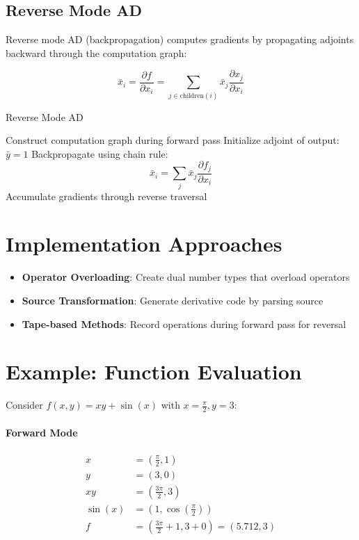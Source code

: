 \documentclass{article}
\begin{document}
\subsection{Reverse Mode AD}
Reverse mode AD (backpropagation) computes gradients by propagating adjoints backward through the computation graph:

\begin{equation}
\bar{x}_i = \frac{\partial f}{\partial x_i} = \sum_{j \in \text{children}(i)} \bar{x}_j \frac{\partial x_j}{\partial x_i}
\end{equation}

\begin{algorithm}
\caption{Reverse Mode AD}
\begin{algorithmic}[1]
\State Construct computation graph during forward pass
\State Initialize adjoint of output: $\bar{y} = 1$
\State Backpropagate using chain rule:
\[
\bar{x}_i = \sum_{j} \bar{x}_j \frac{\partial f_j}{\partial x_i}
\]
\State Accumulate gradients through reverse traversal
\end{algorithmic}
\end{algorithm}

\section{Implementation Approaches}
\begin{itemize}
\item \textbf{Operator Overloading}: Create dual number types that overload operators
\item \textbf{Source Transformation}: Generate derivative code by parsing source
\item \textbf{Tape-based Methods}: Record operations during forward pass for reversal
\end{itemize}

\section{Example: Function Evaluation}
Consider $f(x, y) = xy + \sin(x)$ with $x = \frac{\pi}{2}, y = 3$:

\paragraph{Forward Mode}
\begin{align*}
x &= (\frac{\pi}{2}, 1) \\
y &= (3, 0) \\
xy &= (\frac{3\pi}{2}, 3) \\
\sin(x) &= (1, \cos(\frac{\pi}{2})) \\
f &= (\frac{3\pi}{2} + 1, 3 + 0) = (5.712, 3)
\end{align*}
\end{document}
